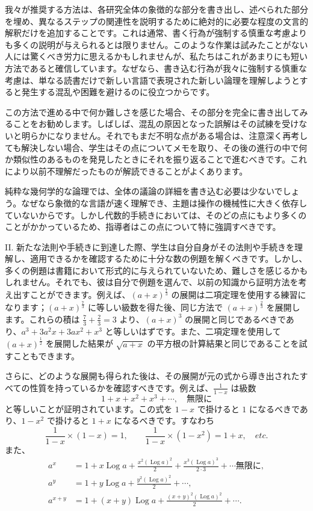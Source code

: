 \documentclass[a4paper,11pt,openany]{ltjsbook}
\newcommand{\Log}{\operatorname{Log}}
\begin{document}
我々が推奨する方法は、各研究全体の象徴的な部分を書き出し、述べられた部分を埋め、異なるステップの関連性を説明するために絶対的に必要な程度の文言的解釈だけを追加することです。これは通常、書く行為が強制する慎重な考慮よりも多くの説明が与えられるとは限りません。このような作業は試みたことがない人には驚くべき労力に思えるかもしれませんが、私たちはこれがあまりにも短い方法であると確信しています。なぜなら、書き込む行為が我々に強制する慎重な考慮は、単なる読書だけで新しい言語で表現された新しい論理を理解しようとすると発生する混乱や困難を避けるのに役立つからです。

この方法で進める中で何か難しさを感じた場合、その部分を完全に書き出してみることをお勧めします。しばしば、混乱の原因となった誤解はその試練を受けないと明らかになりません。それでもまだ不明な点がある場合は、注意深く再考しても解決しない場合、学生はその点についてメモを取り、その後の進行の中で何か類似性のあるものを発見したときにそれを振り返ることで進むべきです。これにより以前不理解だったものが解読できることがよくあります。

純粋な幾何学的な論理では、全体の議論の詳細を書き込む必要は少ないでしょう。なぜなら象徴的な言語が速く理解でき、主題は操作の機械性に大きく依存していないからです。しかし代数的手続きにおいては、そのどの点にもより多くのことがかかっているため、指導者はこの点について特に強調すべきです。

II. 新たな法則や手続きに到達した際、学生は自分自身がその法則や手続きを理解し、適用できるかを確認するために十分な数の例題を解くべきです。しかし、多くの例題は書籍において形式的に与えられていないため、難しさを感じるかもしれません。それでも、彼は自分で例題を選んで、以前の知識から証明方法を考え出すことができます。例えば、$(a + x)^{\frac{7}{3}}$ の展開は二項定理を使用する練習になります；$(a + x)^{\frac{7}{3}}$ に等しい級数を得た後、同じ方法で $(a + x)^{\frac{2}{3}}$ を展開します。これらの積は $\frac{7}{3} + \frac{2}{3} = 3$ より、$(a + x)^{3}$ の展開と同じであるべきであり、$a^{3} + 3a^{2}x + 3ax^{2} + x^{3}$ と等しいはずです。また、二項定理を使用して $(a + x)^{\frac{1}{2}}$ を展開した結果が $\sqrt{a + x}$ の平方根の計算結果と同じであることを試すこともできます。

さらに、どのような展開も得られた後は、その展開が元の式から導き出されたすべての性質を持っているかを確認すべきです。例えば、$\frac{1}{1 - x}$ は級数
\[
1 + x + x^{2} + x^{3} + \cdots, \quad \textit{無限に}
\]
と等しいことが証明されています。この式を $1 - x$ で掛けると $1$ になるべきであり、$1 - x^{2}$ で掛けると $1 + x$ になるべきです。すなわち
\[
\frac{1}{1 - x} \times (1 - x) = 1, \qquad
\frac{1}{1 - x} \times (1 - x^{2}) = 1 + x, \quad \textit{etc.}
\]
また、
\begin{align*}
a^{x} &= 1 + x \Log a + \frac{x^{2} (\Log a)^{2}}{2} + \frac{x^{3} (\Log a)^{3}}{2 \cdot 3} + \cdots \textit{無限に}, \\
a^{y} &= 1 + y \Log a + \frac{y^{2} (\Log a)^{2}}{2} + \cdots, \\
a^{x+y} &= 1 + (x + y) \Log a + \frac{(x + y)^{2} (\Log a)^{2}}{2} + \cdots.
\end{align*}
\end{document}
